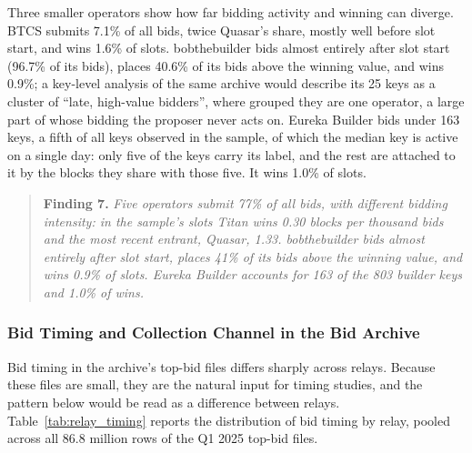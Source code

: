 \documentclass[11pt]{article}
\begin{document}
Three smaller operators show how far bidding activity and winning can
diverge. BTCS submits 7.1\% of all bids, twice Quasar's share, mostly well
before slot start, and wins 1.6\% of slots. bobthebuilder bids almost
entirely after slot start (96.7\% of its bids), places 40.6\% of its bids
above the winning value, and wins 0.9\%; a key-level analysis of the same
archive would describe its 25 keys as a cluster of ``late, high-value
bidders'', where grouped they are one operator, a large part of whose
bidding the proposer never acts on. Eureka Builder bids under 163 keys, a
fifth of all keys observed in the sample, of which the median key is active
on a single day: only five of the keys carry its label, and the rest are
attached to it by the blocks they share with those five. It wins 1.0\% of
slots.

\begin{quote}
\textbf{Finding 7.} \textit{Five operators submit 77\% of all bids, with
different bidding intensity: in the sample's slots Titan wins 0.30 blocks
per thousand bids and the most recent entrant, Quasar, 1.33. bobthebuilder bids
almost entirely after slot start, places 41\% of its bids above the winning
value, and wins 0.9\% of slots. Eureka Builder accounts for 163 of the 803
builder keys and 1.0\% of wins.}
\end{quote}

\subsubsection{Bid Timing and Collection Channel in the Bid Archive}
\label{sec:timing_artifact}

Bid timing in the archive's top-bid files differs sharply across relays.
Because these files are small, they are the natural input for timing
studies, and the pattern below would be read as a difference between relays.
Table~\ref{tab:relay_timing} reports the distribution of bid timing by relay,
pooled across all 86.8 million rows of the Q1 2025 top-bid files.
\end{document}
